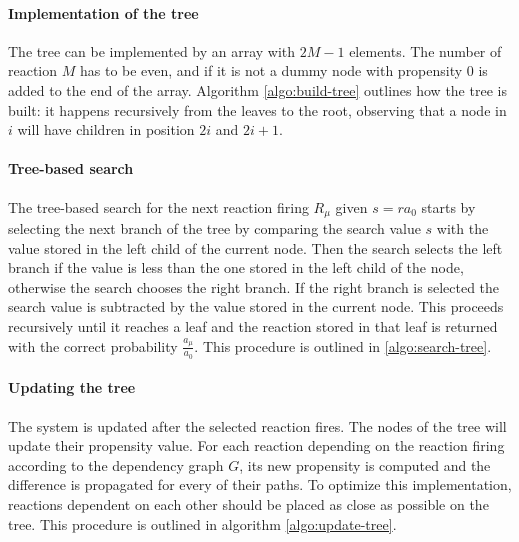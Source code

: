       \paragraph{Implementation of the tree}
      The tree can be implemented by an array with $2M-1$ elements.
      The number of reaction $M$ has to be even, and if it is not a dummy node with propensity $0$ is added to the end of the array.
      Algorithm \ref{algo:build-tree} outlines how the tree is built: it happens recursively from the leaves to the root, observing that a node in $i$ will have children in position $2i$ and $2i+1$.

      

      \paragraph{Tree-based search}
      The tree-based search for the next reaction firing $R_\mu$ given $s = ra_0$ starts by selecting the next branch of the tree by comparing the search value $s$ with the value stored in the left child of the current node.
      Then the search selects the left branch if the value is less than the one stored in the left child of the node, otherwise the search chooses the right branch.
      If the right branch is selected the search value is subtracted by the value stored in the current node.
      This proceeds recursively until it reaches a leaf and the reaction stored in that leaf is returned with the correct probability $\frac{a_\mu}{a_0}$.
      This procedure is outlined in \ref{algo:search-tree}.

      

      \paragraph{Updating the tree}
      The system is updated after the selected reaction fires.
      The nodes of the tree will update their propensity value.
      For each reaction depending on the reaction firing according to the dependency graph $G$, its new propensity is computed and the difference is propagated for every of their paths.
      To optimize this implementation, reactions dependent on each other should be placed as close as possible on the tree.
      This procedure is outlined in algorithm \ref{algo:update-tree}.

      

